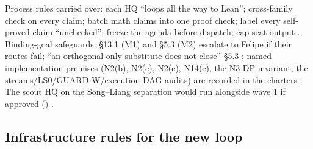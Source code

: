 Process rules carried over: each HQ ``loops all the way to Lean''; cross-family check on every claim; batch math claims into one proof check; label every self-proved claim ``unchecked''; freeze the agenda before dispatch; cap seat output . Binding-goal safeguards: §13.1 (M1) and §5.3 (M2) escalate to Felipe if their routes fail; ``an orthogonal-only substitute does not close'' §5.3 ; named implementation premises (N2(b), N2(c), N2(e), N14(c), the N3 DP invariant, the streams/LS0/GUARD-W/execution-DAG audits) are recorded in the charters . The scout HQ on the Song--Liang separation would run alongside wave 1 if approved () .

\subsection{Infrastructure rules for the new loop}\label{sec:open:infra}

